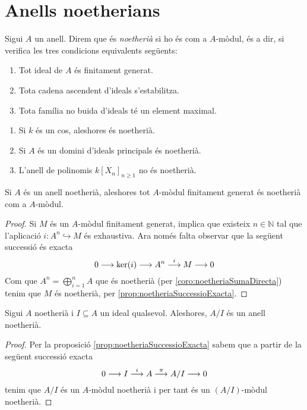 \documentclass[../../../main.tex]{subfiles}
\begin{document}
\section{Anells noetherians}

\begin{defi}
\label{def:anellNoetheria} Sigui $A$ un anell. Direm que és \textit{noetherià} si ho és com a $A$-mòdul, és a dir, si verifica les tres condicions equivalents següents:
\begin{enumerate}[(1)]
    \item Tot ideal de $A$ és finitament generat.
    \item Tota cadena ascendent d'ideals s'estabilitza.
    \item Tota família no buida d'ideals té un element maximal.
\end{enumerate}
\end{defi}

\begin{ej}
\begin{enumerate}[(1)]
    \item Si $k$ és un cos, aleshores és noetherià.
    \item Si $A$ és un domini d'ideals principals és noetherià.
    \item L'anell de polinomis $k[X_n]_{n\geq 1}$ no és noetherià.
\end{enumerate}
\end{ej}


\begin{prop}
\label{prop:modulAnellNoetheriaEsNoetheria} Si $A$ és un anell noetherià, aleshores tot $A$-mòdul finitament generat és noetherià com a $A$-mòdul.
\end{prop}
\begin{proof}
Si $M$ és un $A$-mòdul finitament generat, implica que existeix $n\in\mathbb{N}$ tal que l'aplicació $i:A^n\hookrightarrow M$ és exhaustiva. Ara només falta observar que la següent successió és exacta
\begin{equation}
    \notag
    0\longrightarrow \ker(i)\longrightarrow A^n\overset{i}{\longrightarrow}M\longrightarrow 0
\end{equation}
Com que $A^n = \bigoplus_{i=1}^nA$ que és noetherià (per \ref{coro:noetheriaSumaDirecta}) tenim que $M$ és noetherià, per \ref{prop:noetheriaSuccessioExacta}.
\end{proof}


\begin{prop}
\label{prop:noetheriaAnellQuocient} Sigui $A$ noetherià i $I\subseteq A$ un ideal qualsevol. Aleshores, $A/I$ és un anell noetherià.
\end{prop}
\begin{proof}
Per la proposició \ref{prop:noetheriaSuccessioExacta} sabem que a partir de la següent successió exacta
\begin{equation}
    \notag
    0\longrightarrow I\overset{i}{\longrightarrow}A\overset{\pi}{\longrightarrow}A/I\longrightarrow 0
\end{equation}
tenim que $A/I$ és un $A$-mòdul noetherià i per tant és un $(A/I)$-mòdul noetherià.
\end{proof}
\end{document}
